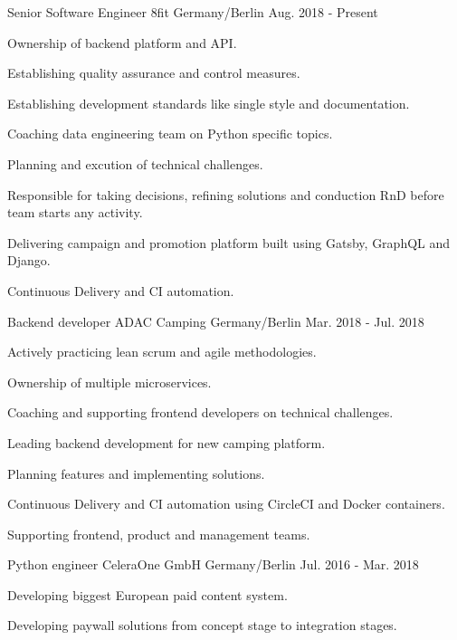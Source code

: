 \begin{cventries}
  \cventry
    {Senior Software Engineer}
    {8fit}
    {Germany/Berlin}
    {Aug. 2018 - Present}
    {
      \begin{cvitems}
        \item {Ownership of backend platform and API.}
        \item {Establishing quality assurance and control measures.}
        \item {Establishing development standards like single style and documentation.}
        \item {Coaching data engineering team on Python specific topics.}
        \item {Planning and excution of technical challenges.}
        \item {Responsible for taking decisions, refining solutions and conduction RnD before team starts any activity.}
        \item {Delivering campaign and promotion platform built using Gatsby, GraphQL and Django.}
        \item {Continuous Delivery and CI automation.}
      \end{cvitems}
    }
  \cventry
    {Backend developer}
    {ADAC Camping}
    {Germany/Berlin}
    {Mar. 2018 - Jul. 2018}
    {
      \begin{cvitems}
        \item {Actively practicing lean scrum and agile methodologies.}
        \item {Ownership of multiple microservices.}
        \item {Coaching and supporting frontend developers on technical challenges.}
        \item {Leading backend development for new camping platform.}
        \item {Planning features and implementing solutions.}
        \item {Continuous Delivery and CI automation using CircleCI and Docker containers.}
        \item {Supporting frontend, product and management teams.}
      \end{cvitems}
    }
  \cventry
    {Python engineer}
    {CeleraOne GmbH}
    {Germany/Berlin}
    {Jul. 2016 - Mar. 2018}
    {
      \begin{cvitems}
        \item {Developing biggest European paid content system.}
        \item {Developing paywall solutions from concept stage to integration stages.}

\end{cvitems}}
\end{cventries}
